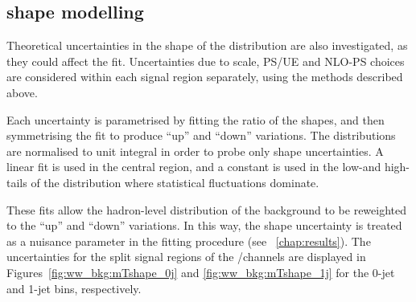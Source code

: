 \subsection{\mt shape modelling}
\label{sec:ww_bkg:mt}

Theoretical uncertainties in the shape of the \mt distribution are also investigated, 
as they could affect the fit. Uncertainties due to scale, PS/UE and NLO-PS choices are 
considered within each signal region separately, using the methods described above.

Each uncertainty is parametrised by fitting the ratio of the \mt shapes, and then 
symmetrising the fit to produce ``up'' and ``down'' variations. The \mt distributions are 
normalised to unit integral in order to probe only shape uncertainties. A linear 
fit is used in the central \mt region, and a constant is used in the low-\mt and 
high-\mt tails of the distribution where statistical fluctuations dominate.

These fits allow the hadron-level \mt distribution of the \WW background to be reweighted 
to the ``up'' and ``down'' variations. In this way, the \mt shape uncertainty is treated 
as a nuisance parameter in the \HWW fitting procedure (see \Chapter~\ref{chap:results}). 
The uncertainties for the split signal regions of the \emch/\mech channels are displayed in 
Figures~\ref{fig:ww_bkg:mTshape_0j} and \ref{fig:ww_bkg:mTshape_1j} for the 0-jet and 1-jet 
bins, respectively.

